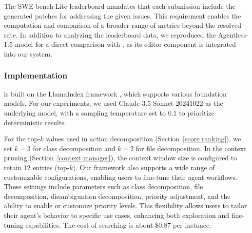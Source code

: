 The SWE-bench Lite leaderboard mandates that each submission include the generated patches for addressing the given issues. This requirement enables the computation and comparison of a broader range of metrics beyond the resolved rate. In addition to analyzing the leaderboard data, we reproduced the Agentless-1.5 model for a direct comparison with \nickname, as its editor component is integrated into our system.

\subsubsection{Implementation} \label{eval_setup_implem}

\nickname is built on the LlamaIndex framework \cite{Liu_LlamaIndex_2022}, which supports various foundation models. For our experiments, we used Claude-3.5-Sonnet-20241022 \cite{claudethreefive} as the underlying model, with a sampling temperature set to 0.1 to prioritize deterministic results. 


For the top-$k$ values used in action decomposition (Section~\ref{score ranking}), we set $k = 3$ for class decomposition and $k = 2$ for file decomposition. In the context pruning (Section~\ref{context manager}), the context window size is configured to retain 12 entries (top-$k$). Our framework also supports a wide range of customizable configurations, enabling users to fine-tune their agent workflows. These settings include parameters such as class decomposition, file decomposition, disambiguation decomposition, priority adjustment, and the ability to enable or customize priority levels. This flexibility allows users to tailor their agent's behavior to specific use cases, enhancing both exploration and fine-tuning capabilities. The cost of searching is about \$0.87 per instance.

